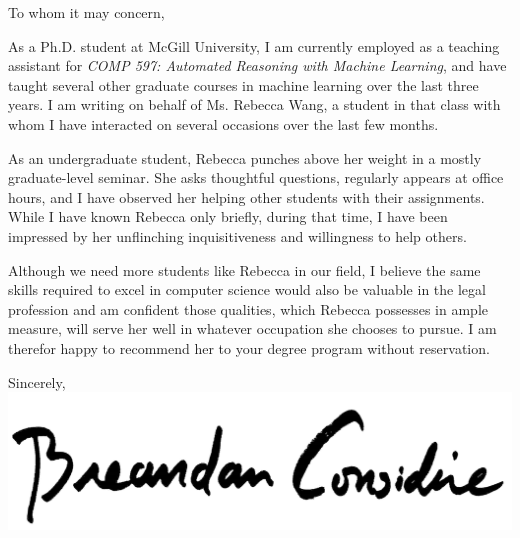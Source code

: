 \documentclass{letter}
\begin{document}
    \begin{letter}{}
        \opening{To whom it may concern,\\}
        As a Ph.D. student at McGill University, I am currently employed as a teaching assistant for \textit{COMP 597: Automated Reasoning with Machine Learning}, and have taught several other graduate courses in machine learning over the last three years. I am writing on behalf of Ms. Rebecca Wang, a student in that class with whom I have interacted on several occasions over the last few months.

        As an undergraduate student, Rebecca punches above her weight in a mostly graduate-level seminar. She asks thoughtful questions, regularly appears at office hours, and I have observed her helping other students with their assignments. While I have known Rebecca only briefly, during that time, I have been impressed by her unflinching inquisitiveness and willingness to help others.

        Although we need more students like Rebecca in our field, I believe the same skills required to excel in computer science would also be valuable in the legal profession and am confident those qualities, which Rebecca possesses in ample measure, will serve her well in whatever occupation she chooses to pursue. I am therefor happy to recommend her to your degree program without reservation.\\
        \closing{Sincerely,\\
            \includegraphics[scale=0.06]{signature.png}\\
        }
    \end{letter}
\end{document}
